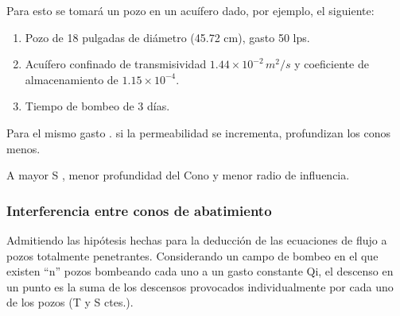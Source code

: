 Para esto se tomará un pozo en un acuífero dado, por ejemplo, el siguiente:
\begin{example}
    \begin{enumerate}
        \item Pozo de 18 pulgadas de diámetro (45.72 cm), gasto 50 lps.
        \item Acuífero confinado de transmisividad $1.44\times 10^{-2}\, m^2/s$ y coeficiente de almacenamiento de $1.15\times 10^{-4}$.
        \item Tiempo de bombeo de 3 días.
    \end{enumerate}
\end{example}
Para el mismo gasto . si la permeabilidad se incrementa, profundizan los conos menos.

A mayor S , menor profundidad del Cono y menor radio de influencia.

\subsubsection{Interferencia entre conos de abatimiento}
Admitiendo las hipótesis hechas para la deducción de las ecuaciones de flujo a pozos totalmente penetrantes. Considerando un campo de bombeo en el que existen “n” pozos bombeando cada uno a un gasto constante Qi, el descenso en un punto es la suma de los descensos provocados individualmente por cada uno de los pozos (T y S ctes.).

